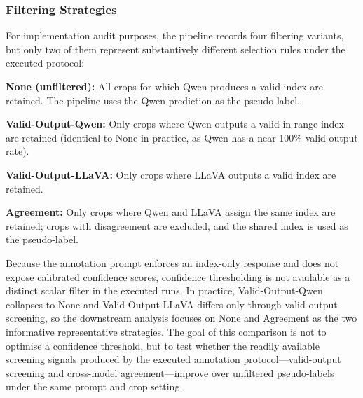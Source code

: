 \documentclass{ieeeaccess}
\providecommand{\DIFaddbegin}{} %
\providecommand{\DIFaddend}{} %
\providecommand{\DIFdelbegin}{} %
\providecommand{\DIFdelend}{} %
\newcommand{\DIFscaledelfig}{0.5}
\newlength{\DIFdelgraphicswidth} %
\newlength{\DIFdelgraphicsheight} %
\newcommand{\DIFaddincludegraphics}[2][]{{\color{blue}\fbox{\DIFOincludegraphics[#1]{#2}}}} %
\newcommand{\DIFdelincludegraphics}[2][]{%
\sbox{\DIFdelgraphicsbox}{\DIFOincludegraphics[#1]{#2}}%
\settoboxwidth{\DIFdelgraphicswidth}{\DIFdelgraphicsbox} %
\settoboxtotalheight{\DIFdelgraphicsheight}{\DIFdelgraphicsbox} %
\scalebox{\DIFscaledelfig}{%
\parbox[b]{\DIFdelgraphicswidth}{\usebox{\DIFdelgraphicsbox}\\[-\baselineskip] \rule{\DIFdelgraphicswidth}{0em}}\llap{\resizebox{\DIFdelgraphicswidth}{\DIFdelgraphicsheight}{%
\setlength{\unitlength}{\DIFdelgraphicswidth}%
\begin{picture}(1,1)%
\thicklines\linethickness{2pt} %
{\color[rgb]{1,0,0}\put(0,0){\framebox(1,1){}}}%
{\color[rgb]{1,0,0}\put(0,0){\line( 1,1){1}}}%
{\color[rgb]{1,0,0}\put(0,1){\line(1,-1){1}}}%
\end{picture}%
}\hspace*{3pt}}} %
} %
\DeclareRobustCommand{\DIFaddbegin}{\DIFOaddbegin \let\includegraphics\DIFaddincludegraphics} %
\DeclareRobustCommand{\DIFaddend}{\DIFOaddend \let\includegraphics\DIFOincludegraphics} %
\DeclareRobustCommand{\DIFdelbegin}{\DIFOdelbegin \let\includegraphics\DIFdelincludegraphics} %
\DeclareRobustCommand{\DIFdelend}{\DIFOaddend \let\includegraphics\DIFOincludegraphics} %
\begin{document}
\subsubsection{Filtering Strategies}

For implementation audit purposes, the pipeline records four filtering
variants, but only two of them represent substantively different
selection rules under the executed protocol:

\DIFdelbegin %
\DIFdelend \DIFaddbegin \noindent\DIFaddend \textbf{None (unfiltered):} All crops for which Qwen
produces a valid index are retained.
The pipeline uses the Qwen prediction as the pseudo-label.

\DIFdelbegin %
\DIFdelend \DIFaddbegin \noindent\DIFaddend \textbf{Valid-Output-Qwen:} Only crops where Qwen outputs
a valid in-range index are retained (identical to None in
practice, as Qwen has a near-100\% valid-output rate).

\DIFdelbegin %
\DIFdelend \DIFaddbegin \noindent\DIFaddend \textbf{Valid-Output-LLaVA:} Only crops where LLaVA outputs
a valid index are retained.

\DIFdelbegin %
\DIFdelend \DIFaddbegin \noindent\DIFaddend \textbf{Agreement:} Only crops where Qwen and LLaVA assign
the same index are retained; crops with disagreement are excluded,
and the shared index is used as the pseudo-label.
\DIFdelbegin %
\DIFdelend 

Because the annotation prompt enforces an index-only response and does
not expose calibrated confidence scores, confidence thresholding is not
available as a distinct scalar filter in the executed runs.
In practice, Valid-Output-Qwen collapses to None and Valid-Output-LLaVA
differs only through valid-output screening, so the
downstream analysis focuses on None and Agreement as the two
informative representative strategies.
The goal of this comparison is not to optimise a confidence
threshold, but to test whether the readily available screening signals
produced by the executed annotation protocol---valid-output screening
and cross-model agreement---improve over unfiltered pseudo-labels under
the same prompt and crop setting.
\end{document}
